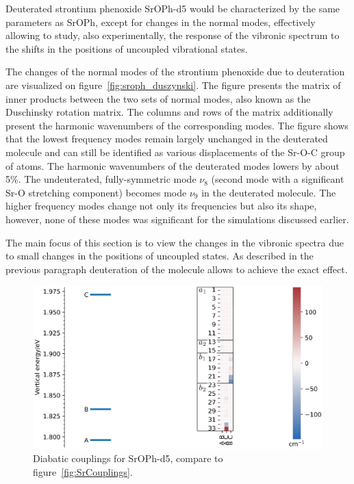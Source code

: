 \documentclass{article}
\begin{document}
Deuterated strontium phenoxide SrOPh-d5 would be characterized by the same
parameters as SrOPh, except for changes in the normal modes, effectively
allowing to study, also experimentally, the response of the vibronic spectrum
to the shifts in the positions of uncoupled vibrational states.

The changes of the normal modes of the strontium phenoxide due to deuteration
are visualized on figure~\ref{fig:sroph_duszynski}. The figure presents the
matrix of inner products between the two sets of normal modes, also known as
the Duschinsky rotation matrix. The columns and rows of the matrix additionally
present the harmonic wavenumbers of the corresponding modes. The figure shows
that the lowest frequency modes remain largely unchanged in the deuterated
molecule and can still be identified as various displacements of the Sr-O-C
group of atoms. The harmonic wavenumbers of the deuterated modes lowers by
about 5\%. The undeuterated, fully-symmetric mode $\nu _8$ (second mode with a
significant Sr-O stretching component) becomes mode $\nu _9$ in the deuterated
molecule. The higher frequency modes change not only its frequencies but also
its shape, however, none of these modes was significant for the simulations
discussed earlier.

The main focus of this section is to view the changes in the vibronic spectra
due to small changes in the positions of uncoupled states. As described in the
previous paragraph deuteration of the molecule allows to achieve the exact
effect.

\begin{figure}
    \begin{center}
        \includegraphics[width=12 cm]{./figures/SrOPh5dCouplings.pdf}
    \end{center}
    \caption{
        Diabatic couplings for SrOPh-d5, compare to
        figure~\ref{fig:SrCouplings}.
    }
    \label{fig:srd5_couplings}
\end{figure}
\end{document}
